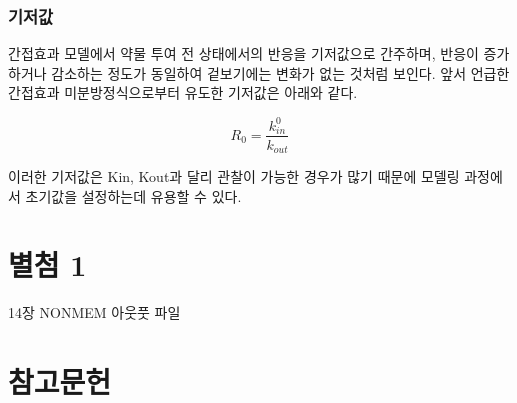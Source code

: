 \documentclass[
  10pt,
  krantz2,
  a4paper]{krantz}
\theoremstyle{definition}
\theoremstyle{definition}
\theoremstyle{definition}
\theoremstyle{remark}
\begin{document}
\hypertarget{uxae30uxc800uxac12}{%
\subsection{기저값}\label{uxae30uxc800uxac12}}

간접효과 모델에서 약물 투여 전 상태에서의 반응을 기저값으로 간주하며, 반응이 증가하거나 감소하는 정도가 동일하여 겉보기에는 변화가 없는 것처럼 보인다. 앞서 언급한 간접효과 미분방정식으로부터 유도한 기저값은 아래와 같다.

\[
R_{0} = \frac{k_{in}^0}{k_{out}}
\]

이러한 기저값은 Kin, Kout과 달리 관찰이 가능한 경우가 많기 때문에 모델링 과정에서 초기값을 설정하는데 유용할 수 있다.

\backmatter

\hypertarget{appendix-uxbcc4uxcca8}{%
\appendix {}}


\hypertarget{uxbcc4uxcca8-1}{%
\chapter{별첨 1}\label{uxbcc4uxcca8-1}}

14장 NONMEM 아웃풋 파일

\hypertarget{uxcc38uxace0uxbb38uxd5cc}{%
\chapter*{참고문헌}\label{uxcc38uxace0uxbb38uxd5cc}}
\end{document}
